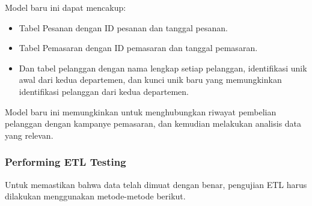 \documentclass{article}
\begin{document}
Model baru ini dapat mencakup:
\begin{itemize}
    \item Tabel Pesanan dengan ID pesanan dan tanggal pesanan.
    \item Tabel Pemasaran dengan ID pemasaran dan tanggal pemasaran.
    \item Dan tabel pelanggan dengan nama lengkap setiap pelanggan, identifikasi unik awal dari kedua departemen, dan kunci unik baru yang memungkinkan identifikasi pelanggan dari kedua departemen.
\end{itemize}

Model baru ini memungkinkan untuk menghubungkan riwayat pembelian pelanggan dengan kampanye pemasaran, dan kemudian melakukan analisis data yang relevan.

\subsubsection{Performing ETL Testing}
Untuk memastikan bahwa data telah dimuat dengan benar, pengujian ETL harus dilakukan menggunakan metode-metode berikut.
\end{document}
